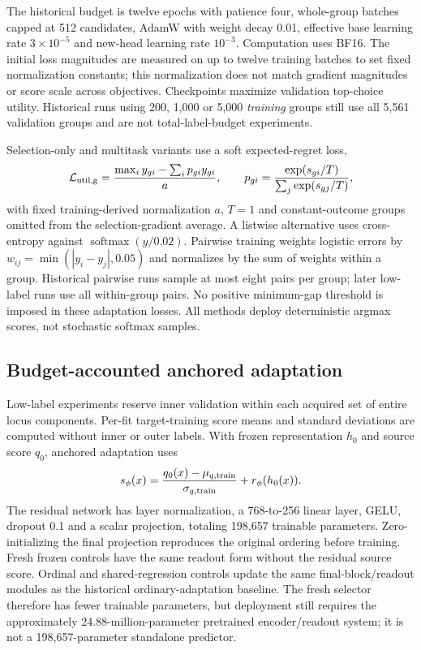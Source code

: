 The historical budget is twelve epochs with patience four, whole-group batches capped at 512 candidates, AdamW with weight decay 0.01, effective base learning rate $3\times10^{-5}$ and new-head learning rate $10^{-3}$. Computation uses BF16. The initial loss magnitudes are measured on up to twelve training batches to set fixed normalization constants; this normalization does not match gradient magnitudes or score scale across objectives. Checkpoints maximize validation top-choice utility. Historical runs using 200, 1,000 or 5,000 \emph{training} groups still use all 5,561 validation groups and are not total-label-budget experiments.

Selection-only and multitask variants use a soft expected-regret loss,
\begin{equation}
\mathcal L_{\rm util,g}=\frac{\max_i y_{gi}-\sum_i p_{gi}y_{gi}}{a},\qquad
p_{gi}=\frac{\exp(s_{gi}/T)}{\sum_j\exp(s_{gj}/T)},
\label{eq:util}
\end{equation}
with fixed training-derived normalization $a$, $T=1$ and constant-outcome groups omitted from the selection-gradient average. A listwise alternative uses cross-entropy against $\operatorname{softmax}(y/0.02)$. Pairwise training weights logistic errors by $w_{ij}=\min(|y_i-y_j|,0.05)$ and normalizes by the sum of weights within a group. Historical pairwise runs sample at most eight pairs per group; later low-label runs use all within-group pairs. No positive minimum-gap threshold is imposed in these adaptation losses. All methods deploy deterministic argmax scores, not stochastic softmax samples.

\subsection{Budget-accounted anchored adaptation}
Low-label experiments reserve inner validation within each acquired set of entire locus components. Per-fit target-training score means and standard deviations are computed without inner or outer labels. With frozen representation $h_0$ and source score $q_0$, anchored adaptation uses
\begin{equation}
s_\phi(x)=\frac{q_0(x)-\mu_{q,\rm train}}{\sigma_{q,\rm train}}+r_\phi(h_0(x)).
\end{equation}
The residual network has layer normalization, a 768-to-256 linear layer, GELU, dropout 0.1 and a scalar projection, totaling 198,657 trainable parameters. Zero-initializing the final projection reproduces the original ordering before training. Fresh frozen controls have the same readout form without the residual source score. Ordinal and shared-regression controls update the same final-block/readout modules as the historical ordinary-adaptation baseline. The fresh selector therefore has fewer trainable parameters, but deployment still requires the approximately 24.88-million-parameter pretrained encoder/readout system; it is not a 198,657-parameter standalone predictor.


